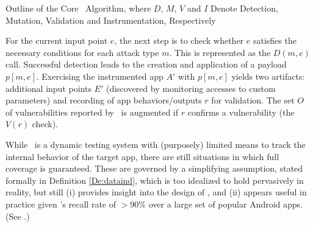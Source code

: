 \begin{algorithm}[t]
	\DontPrintSemicolon
	\;
	\;
	\;
	\caption{\label{Al:maalg}Outline of the Core \Tool\ Algorithm, where $D$, $M$, $V$ and $I$ Denote Detection, Mutation, Validation and Instrumentation, Respectively}
\end{algorithm}


For the current input point $e$, the next step is to check whether $e$ satisfies the necessary conditions for each attack type $m$. This is represented as the $D(m,e)$ call. Successful detection leads to the creation and application of a payload $p[m,e]$. Exercising the instrumented app $A'$ with $p[m,e]$ yields two artifacts: additional input points $E'$ (discovered by monitoring accesses to custom parameters) and recording of app behaviors/outputs $r$ for validation. The set $O$ of vulnerabilities reported by \Tool\ is augmented if $r$ confirms a vulnerability (the $V(r)$ check).

While \Tool\ is a dynamic testing system with (purposely) limited means to track the internal behavior of the target app, there are still situations in which full coverage is guaranteed. These are governed by a simplifying assumption, stated formally in Definition \ref{De:dataind}, which is too idealized to hold pervasively in reality, but still (i) provides insight into the design of \Tool, and (ii) appears useful in practice given \Tool's recall rate of $>90\%$ over a large set of popular Android apps. (See .)

